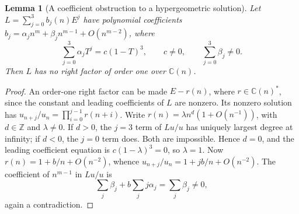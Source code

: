 \documentclass[11pt,a4paper]{article}
\newtheorem{lemma}[theorem]{Lemma}
\theoremstyle{definition}
\theoremstyle{remark}
\numberwithin{equation}{section}
\begin{document}
\begin{lemma}[A coefficient obstruction to a hypergeometric solution]
\label{p3:lem:ga-obstruction}
Let $L=\sum_{j=0}^3 b_j(n)E^j$ have polynomial coefficients
$b_j=\alpha_j n^m+\beta_j n^{m-1}+O(n^{m-2})$, where
\[
 \sum_{j=0}^3\alpha_j T^j=c(1-T)^3,\qquad
 c\ne0,\qquad \sum_{j=0}^3\beta_j\ne0.
\]
Then $L$ has no right factor of order one over $\mathbb C(n)$.
\end{lemma}
\begin{proof}
An order-one right factor can be made $E-r(n)$, where
$r\in\mathbb C(n)^*$, since the constant and leading coefficients
of $L$ are nonzero. Its nonzero solution has
$u_{n+j}/u_n=\prod_{i=0}^{j-1}r(n+i)$. Write
$r(n)=\lambda n^d(1+O(n^{-1}))$, with $d\in\mathbb Z$ and
$\lambda\ne0$. If $d>0$, the $j=3$ term of $Lu/u$ has uniquely
largest degree at infinity; if $d<0$, the $j=0$ term does. Both are
impossible. Hence $d=0$, and the leading coefficient equation is
$c(1-\lambda)^3=0$, so $\lambda=1$.
Now $r(n)=1+b/n+O(n^{-2})$, whence
$u_{n+j}/u_n=1+jb/n+O(n^{-2})$. The coefficient of $n^{m-1}$
in $Lu/u$ is
\[
 \sum_j\beta_j+b\sum_jj\alpha_j=\sum_j\beta_j\ne0,
\]
again a contradiction.
\end{proof}
\end{document}
